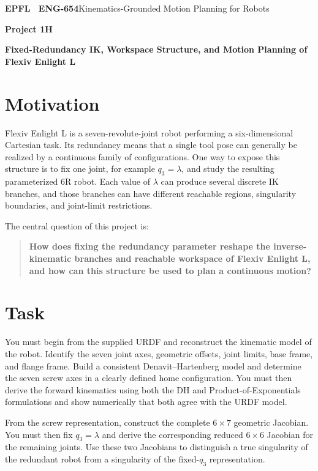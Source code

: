 \documentclass[11pt,a4paper]{article}
\begin{document}
{\small\textbf{EPFL \textbar\ ENG-654}\hfill Kinematics-Grounded Motion Planning for Robots}
\vspace{5mm}

{\color{epflred}\Large\bfseries Project 1H}

{\LARGE\bfseries Fixed-Redundancy IK, Workspace Structure, and Motion Planning of Flexiv Enlight L\par}

\section*{Motivation}
Flexiv Enlight L is a seven-revolute-joint robot performing a six-dimensional Cartesian task. Its redundancy means that a single tool pose can generally be realized by a continuous family of configurations. One way to expose this structure is to fix one joint, for example $q_3=\lambda$, and study the resulting parameterized 6R robot. Each value of $\lambda$ can produce several discrete IK branches, and those branches can have different reachable regions, singularity boundaries, and joint-limit restrictions.

The central question of this project is:

\begin{quote}
\textbf{How does fixing the redundancy parameter reshape the inverse-kinematic branches and reachable workspace of Flexiv Enlight L, and how can this structure be used to plan a continuous motion?}
\end{quote}

\section*{Task}
You must begin from the supplied URDF and reconstruct the kinematic model of the robot. Identify the seven joint axes, geometric offsets, joint limits, base frame, and flange frame. Build a consistent Denavit--Hartenberg model and determine the seven screw axes in a clearly defined home configuration. You must then derive the forward kinematics using both the DH and Product-of-Exponentials formulations and show numerically that both agree with the URDF model.

From the screw representation, construct the complete $6\times7$ geometric Jacobian. You must then fix $q_3=\lambda$ and derive the corresponding reduced $6\times6$ Jacobian for the remaining joints. Use these two Jacobians to distinguish a true singularity of the redundant robot from a singularity of the fixed-$q_3$ representation.
\end{document}
